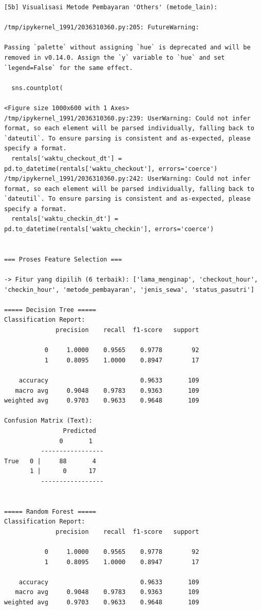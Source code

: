 \begin{lstlisting}[caption={Output 16}]
[5b] Visualisasi Metode Pembayaran 'Others' (metode_lain):

/tmp/ipykernel_1991/2036310360.py:205: FutureWarning: 

Passing `palette` without assigning `hue` is deprecated and will be removed in v0.14.0. Assign the `y` variable to `hue` and set `legend=False` for the same effect.

  sns.countplot(

<Figure size 1000x600 with 1 Axes>
/tmp/ipykernel_1991/2036310360.py:239: UserWarning: Could not infer format, so each element will be parsed individually, falling back to `dateutil`. To ensure parsing is consistent and as-expected, please specify a format.
  rentals['waktu_checkout_dt'] = pd.to_datetime(rentals['waktu_checkout'], errors='coerce')
/tmp/ipykernel_1991/2036310360.py:242: UserWarning: Could not infer format, so each element will be parsed individually, falling back to `dateutil`. To ensure parsing is consistent and as-expected, please specify a format.
  rentals['waktu_checkin_dt'] = pd.to_datetime(rentals['waktu_checkin'], errors='coerce')


=== Proses Feature Selection ===

-> Fitur yang dipilih (6 terbaik): ['lama_menginap', 'checkout_hour', 'checkin_hour', 'metode_pembayaran', 'jenis_sewa', 'status_pasutri']

===== Decision Tree =====
Classification Report:
              precision    recall  f1-score   support

           0     1.0000    0.9565    0.9778        92
           1     0.8095    1.0000    0.8947        17

    accuracy                         0.9633       109
   macro avg     0.9048    0.9783    0.9363       109
weighted avg     0.9703    0.9633    0.9648       109

Confusion Matrix (Text):
                Predicted
               0       1
          -----------------
True   0 |     88       4
       1 |      0      17
          -----------------


===== Random Forest =====
Classification Report:
              precision    recall  f1-score   support

           0     1.0000    0.9565    0.9778        92
           1     0.8095    1.0000    0.8947        17

    accuracy                         0.9633       109
   macro avg     0.9048    0.9783    0.9363       109
weighted avg     0.9703    0.9633    0.9648       109


\end{lstlisting}
